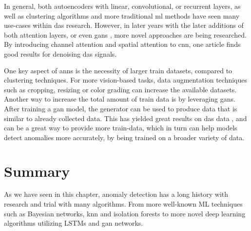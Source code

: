 
In general, both autoencoders with linear, convolutional, or recurrent layers, as well as clustering algorithms and more traditional \acrshort{ml} methods have seen many use-cases within \acrshort{das} research. However, in later years with the later additions of both attention layers, or even \acrshort{gan}s \cite{goodfellow2014generative, goodfellow2016nips}, more novel approaches are being researched. By introducing channel attention and spatial attention to \acrshort{cnn}, one article \cite{eage:/content/journals/10.1111/1365-2478.13355} finds good results for denoising \acrshort{das} signals. 

One key aspect of \acrshort{ann}s is the necessity of larger train datasets, compared to clustering techniques. For more vision-based tasks, data augmentation techniques such as cropping, resizing or color grading can increase the available datasets. Another way to increase the total amount of train data is by leveraging \acrshort{gan}s. After training a \acrshort{gan} model, the generator can be used to produce data that is similar to already collected data. This has yielded great results on \acrshort{das} data \cite{Shiloh:19}, and can be a great way to provide more train-data, which in turn can help models detect anomalies more accurately, by being trained on a broader variety of data. \\


\section{Summary}

As we have seen in this chapter, anomaly detection has a long history with research and trial with many algorithms. From more well-known ML techniques such as Bayesian networks, knn and isolation forests to more novel deep learning algorithms utilizing LSTMs and \acrshort{gan} networks. \\


